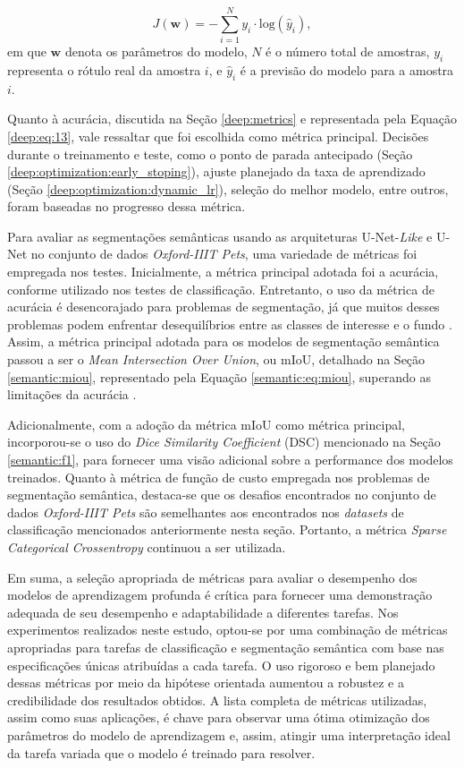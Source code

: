\begin{equation}
    \label{project:eq:metrics1}
    J(\boldsymbol{w}) = - \sum_{i=1}^{N} y_i \cdot \text{log}(\hat{y}_i),
\end{equation}
em que $\boldsymbol{w}$ denota os parâmetros do modelo, $N$ é o número total de amostras, $y_i$ representa o rótulo real da amostra $i$, e $\hat{y}_i$ é a previsão do modelo para a amostra $i$.

Quanto à acurácia, discutida na Seção \ref{deep:metrics} e representada pela Equação \ref{deep:eq:13}, vale ressaltar que foi escolhida como métrica principal. Decisões durante o treinamento e teste, como o ponto de parada antecipado (Seção \ref{deep:optimization:early_stoping}), ajuste planejado da taxa de aprendizado (Seção \ref{deep:optimization:dynamic_lr}), seleção do melhor modelo, entre outros, foram baseadas no progresso dessa métrica.

Para avaliar as segmentações semânticas usando as arquiteturas U-Net-\textit{Like} e U-Net no conjunto de dados \textit{Oxford-IIIT Pets}, uma variedade de métricas foi empregada nos testes. Inicialmente, a métrica principal adotada foi a acurácia, conforme utilizado nos testes de classificação. Entretanto, o uso da métrica de acurácia é desencorajado para problemas de segmentação, já que muitos desses problemas podem enfrentar desequilíbrios entre as classes de interesse e o fundo \citep{Muller2022TowardsSegmentation}. Assim, a métrica principal adotada para os modelos de segmentação semântica passou a ser o \textit{Mean Intersection Over Union}, ou mIoU, detalhado na Seção \ref{semantic:miou}, representado pela Equação \ref{semantic:eq:miou}, superando as limitações da acurácia \citep{Muller2022TowardsSegmentation}.

Adicionalmente, com a adoção da métrica mIoU como métrica principal, incorporou-se o uso do \textit{Dice Similarity Coefficient} (DSC) mencionado na Seção \ref{semantic:f1}, para fornecer uma visão adicional sobre a performance dos modelos treinados. Quanto à métrica de função de custo empregada nos problemas de segmentação semântica, destaca-se que os desafios encontrados no conjunto de dados \textit{Oxford-IIIT Pets} são semelhantes aos encontrados nos \textit{datasets} de classificação mencionados anteriormente nesta seção. Portanto, a métrica \textit{Sparse Categorical Crossentropy} continuou a ser utilizada.

Em suma, a seleção apropriada de métricas para avaliar o desempenho dos modelos de aprendizagem profunda é crítica para fornecer uma demonstração adequada de seu desempenho e adaptabilidade a diferentes tarefas. Nos experimentos realizados neste estudo, optou-se por uma combinação de métricas apropriadas para tarefas de classificação e segmentação semântica com base nas especificações únicas atribuídas a cada tarefa. O uso rigoroso e bem planejado dessas métricas por meio da hipótese orientada aumentou a robustez e a credibilidade dos resultados obtidos. A lista completa de métricas utilizadas, assim como suas aplicações, é chave para observar uma ótima otimização dos parâmetros do modelo de aprendizagem e, assim, atingir uma interpretação ideal da tarefa variada que o modelo é treinado para resolver.


